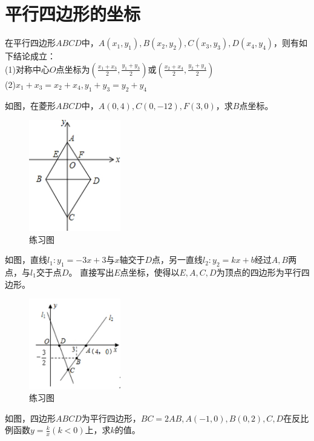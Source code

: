 \documentclass{ecnuthesis}
\begin{document}
\section{平行四边形的坐标}
\begin{conclusion}
    在平行四边形$ABCD$中，$A(x_1,y_1),B(x_2,y_2),C(x_3,y_3),D(x_4,y_4)$，则有如下结论成立： \\
    (1)对称中心$O$点坐标为$(\frac{x_1+x_3}{2},\frac{y_1+y_3}{2})$或$(\frac{x_2+x_4}{2},\frac{y_2+y_4}{2})$ \\
    (2)$x_1+x_3=x_2+x_4,y_1+y_3=y_2+y_4$ \\
\end{conclusion}
\begin{problem}
    如图，在菱形$ABCD$中，$A(0,4),C(0,-12),F(3,0)$，求$B$点坐标。
\end{problem}
\begin{figure}[H]
\centering
\includegraphics[width=4cm]{picture/646.png}
\caption{练习图}
\end{figure}
\begin{problem}
    如图，直线$l_1:y_1=-3x+3$与$x$轴交于$D$点，另一直线$l_2:y_2=kx+b$经过$A,B$两点，与$l_1$交于点$D$。
    直接写出$E$点坐标，使得以$E,A,C,D$为顶点的四边形为平行四边形。
\end{problem}
\begin{figure}[H]
\centering
\includegraphics[width=4cm]{picture/667.png}
\caption{练习图}
\end{figure}
\begin{problem}
    如图，四边形$ABCD$为平行四边形，$BC=2AB,A(-1,0),B(0,2),C,D$在反比例函数$y=\frac{k}{x}(k<0)$上，求$k$的值。
\end{problem}
\end{document}
